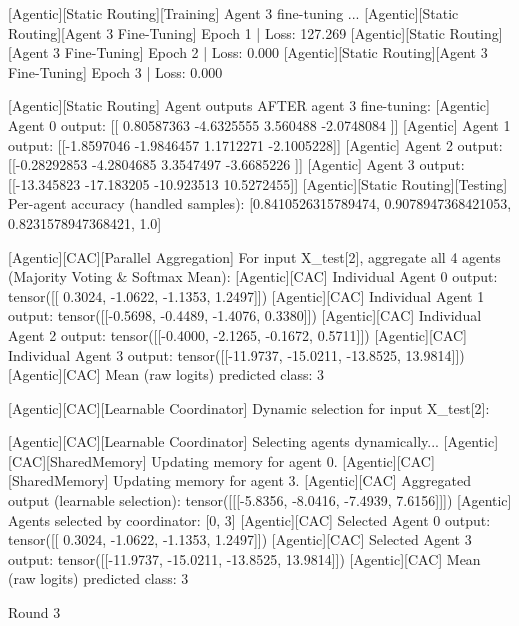 [Agentic][Static Routing][Training] Agent 3 fine-tuning ...
[Agentic][Static Routing][Agent 3 Fine-Tuning] Epoch 1 | Loss: 127.269
[Agentic][Static Routing][Agent 3 Fine-Tuning] Epoch 2 | Loss: 0.000
[Agentic][Static Routing][Agent 3 Fine-Tuning] Epoch 3 | Loss: 0.000

[Agentic][Static Routing] Agent outputs AFTER agent 3 fine-tuning:
[Agentic] Agent 0 output: [[ 0.80587363 -4.6325555   3.560488   -2.0748084 ]]
[Agentic] Agent 1 output: [[-1.8597046 -1.9846457  1.1712271 -2.1005228]]
[Agentic] Agent 2 output: [[-0.28292853 -4.2804685   3.3547497  -3.6685226 ]]
[Agentic] Agent 3 output: [[-13.345823  -17.183205  -10.923513   10.5272455]]
[Agentic][Static Routing][Testing] Per-agent accuracy (handled samples): [0.8410526315789474, 0.9078947368421053, 0.8231578947368421, 1.0]

[Agentic][CAC][Parallel Aggregation] For input X_test[2], aggregate all 4 agents (Majority Voting & Softmax Mean):
[Agentic][CAC] Individual Agent 0 output: tensor([[ 0.3024, -1.0622, -1.1353,  1.2497]])
[Agentic][CAC] Individual Agent 1 output: tensor([[-0.5698, -0.4489, -1.4076,  0.3380]])
[Agentic][CAC] Individual Agent 2 output: tensor([[-0.4000, -2.1265, -0.1672,  0.5711]])
[Agentic][CAC] Individual Agent 3 output: tensor([[-11.9737, -15.0211, -13.8525,  13.9814]])
[Agentic][CAC] Mean (raw logits) predicted class: 3

[Agentic][CAC][Learnable Coordinator] Dynamic selection for input X_test[2]:

[Agentic][CAC][Learnable Coordinator] Selecting agents dynamically...
[Agentic][CAC][SharedMemory] Updating memory for agent 0.
[Agentic][CAC][SharedMemory] Updating memory for agent 3.
[Agentic][CAC] Aggregated output (learnable selection): tensor([[[-5.8356, -8.0416, -7.4939,  7.6156]]])
[Agentic] Agents selected by coordinator: [0, 3]
[Agentic][CAC] Selected Agent 0 output: tensor([[ 0.3024, -1.0622, -1.1353,  1.2497]])
[Agentic][CAC] Selected Agent 3 output: tensor([[-11.9737, -15.0211, -13.8525,  13.9814]])
[Agentic][CAC] Mean (raw logits) predicted class: 3

Round 3

